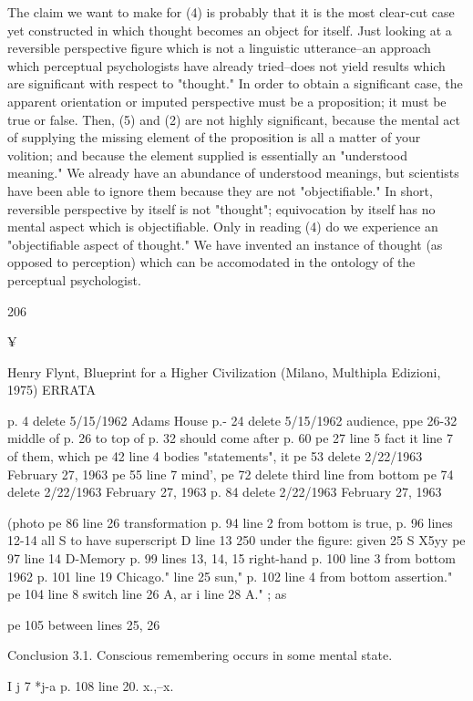 \documentclass[10pt,twoside]{memoir}
\begin{document}
\begin{enumerate}
{{{{{{The claim we want to make for (4) is probably that it is the most 
clear-cut case yet constructed in which thought becomes an object for itself. 
Just looking at a reversible perspective figure which is not a linguistic 
utterance--an approach which perceptual psychologists have already 
tried--does not yield results which are significant with respect to "thought." 
In order to obtain a significant case, the apparent orientation or imputed 
perspective must be a proposition; it must be true or false. Then, (5) and (2) 
are not highly significant, because the mental act of supplying the missing 
element of the proposition is all a matter of your volition; and because the 
element supplied is essentially an "understood meaning." We already have an 
abundance of understood meanings, but scientists have been able to ignore 
them because they are not "objectifiable." In short, reversible perspective by 
itself is not "thought"; equivocation by itself has no mental aspect which is 
objectifiable. Only in reading (4) do we experience an "objectifiable aspect 
of thought." We have invented an instance of thought (as opposed to 
perception) which can be accomodated in the ontology of the perceptual 
psychologist. 


206 


¥ 


Henry Flynt, Blueprint for a Higher Civilization 
(Milano, Multhipla Edizioni, 1975) 
ERRATA 


p. 4 delete 5/15/1962 
Adams House 
p.- 24 delete 5/15/1962 
audience, 
ppe 26-32 middle of p. 26 to top of p. 32 
should come after p. 60 
pe 27 line 5 fact it 
line 7 of them, which 
pe 42 line 4 bodies 
"statements", it 
pe 53 delete 2/22/1963 
February 27, 1963 
pe 55 line 7 mind', 
pe 72 delete third line from bottom 
pe 74 delete 2/22/1963 
February 27, 1963 
p. 84 delete 2/22/1963 
February 27, 1963 


(photo 
pe 86 line 26 transformation 
p. 94 line 2 from bottom is true, 
p. 96 lines 12-14 all S to have superscript D 
line 13 250 
under the figure: given 25 S X5yy 
pe 97 line 14 D-Memory 
p. 99 lines 13, 14, 15 right-hand 
p. 100 line 3 from bottom 1962 
p. 101 line 19 Chicago." 
line 25 sun," 
p. 102 line 4 from bottom assertion." 
pe 104 line 8 switch 
line 26 A, ar 
i 
line 28 A." 
; as 


pe 105 between lines 25, 26 


Conclusion 3.1. Conscious remembering occurs in 
some mental state. 


I j 7 *j-a 
p. 108 line 20. x.,--x. 


}}}}}}
\end{enumerate}
\end{document}
